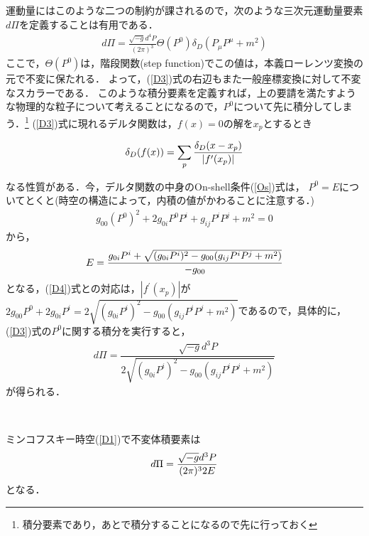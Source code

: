 運動量にはこのような二つの制約が課されるので，次のような三次元運動量要素$d\Pi$を定義することは有用である．
\begin{eqnarray}
\label{D3}
d\Pi=\frac{\sqrt{-g}d^4P}{(2\pi)^3}\Theta(P^{0})\delta_{D}(P_{\mu}P^{\mu}+m^2)
\end{eqnarray}
ここで，$\Theta(P^{0})$は，階段関数(step function)でこの値は，本義ローレンツ変換の元で不変に保たれる．
よって，(\ref{D3})式の右辺もまた一般座標変換に対して不変なスカラーである．%
このような積分要素を定義すれば，上の要請を満たすような物理的な粒子について考えることになるので，$P^{0}$について先に積分してしまう．\footnote{積分要素であり，あとで積分することになるので先に行っておく}
(\ref{D3})式に現れるデルタ関数は，$f(x)=0$の解を$x_p$とするとき
\begin{empheqboxed}
\begin{eqnarray}
\label{D4}
\delta_{D}(f(x))=\sum_{p}{\delta_{D}(x-x_p) \over |f^{\prime}(x_p)|}
\end{eqnarray}
\end{empheqboxed}
なる性質がある．今，デルタ関数の中身のOn-shell条件(\ref{Os})式は，
$P^{0}=E$についてとくと(時空の構造によって，内積の値がかわることに注意する．)
\begin{eqnarray}
g_{00}(P^0)^2+2g_{0i}P^0P^i+g_{ij}P^iP^j+m^2=0
\end{eqnarray}から，
\begin{eqnarray}
E={g_{0i}P^i+\sqrt{(g_{0i}P^i)^2-g_{00}(g_{ij}P^iP^j+m^2)}\over -g_{00}}
\end{eqnarray}
となる，(\ref{D4})式との対応は，$|f^{\prime}(x_p)|$が$2g_{00}P^0+2g_{0i}P^i=2\sqrt{(g_{0i}P^i)^2-g_{00}(g_{ij}P^iP^j+m^2)}$であるので，具体的に，(\ref{D3})式の$P^0$に関する積分を実行すると，
\begin{eqnarray}
d\Pi=\dfrac{\sqrt{-g}d^3P}{2\sqrt{(g_{0i}P^i)^2-g_{00}(g_{ij}P^iP^j+m^2)}}
\end{eqnarray}
が得られる．
\begin{empheqboxed}
\

ミンコフスキー時空(\ref{D1})で不変体積要素は
\begin{eqnarray}
\label{D8}
d\Pi={\sqrt{-g}d^3P\over (2\pi)^32E}
\end{eqnarray}
となる．
\end{empheqboxed}
